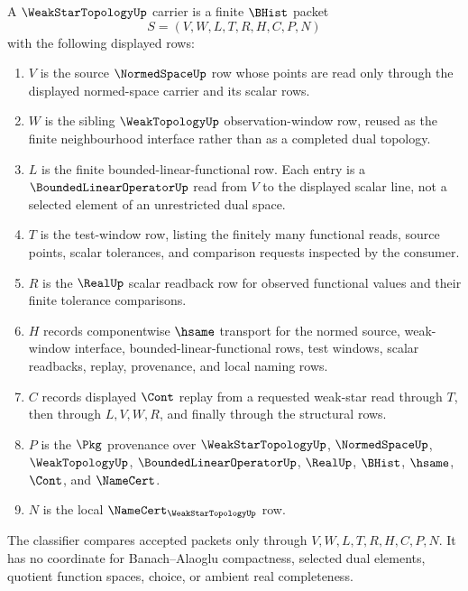 \begin{definition}
\label{def:weak-star-topology-carrier}
A $\WeakStarTopologyUp$ carrier is a finite $\BHist$ packet
$$
S=(V,W,L,T,R,H,C,P,N)
$$
with the following displayed rows:
\begin{enumerate}
\item $V$ is the source $\NormedSpaceUp$ row whose points are read only through the displayed normed-space carrier and its scalar rows.
\item $W$ is the sibling $\WeakTopologyUp$ observation-window row, reused as the finite neighbourhood interface rather than as a completed dual topology.
\item $L$ is the finite bounded-linear-functional row. Each entry is a $\BoundedLinearOperatorUp$ read from $V$ to the displayed scalar line, not a selected element of an unrestricted dual space.
\item $T$ is the test-window row, listing the finitely many functional reads, source points, scalar tolerances, and comparison requests inspected by the consumer.
\item $R$ is the $\RealUp$ scalar readback row for observed functional values and their finite tolerance comparisons.
\item $H$ records componentwise $\hsame$ transport for the normed source, weak-window interface, bounded-linear-functional rows, test windows, scalar readbacks, replay, provenance, and local naming rows.
\item $C$ records displayed $\Cont$ replay from a requested weak-star read through $T$, then through $L,V,W,R$, and finally through the structural rows.
\item $P$ is the $\Pkg$ provenance over $\WeakStarTopologyUp$, $\NormedSpaceUp$, $\WeakTopologyUp$, $\BoundedLinearOperatorUp$, $\RealUp$, $\BHist$, $\hsame$, $\Cont$, and $\NameCert$.
\item $N$ is the local $\NameCert_{\WeakStarTopologyUp}$ row.
\end{enumerate}
The classifier compares accepted packets only through $V,W,L,T,R,H,C,P,N$. It has no coordinate for Banach--Alaoglu compactness, selected dual elements, quotient function spaces, choice, or ambient real completeness.
\end{definition}

